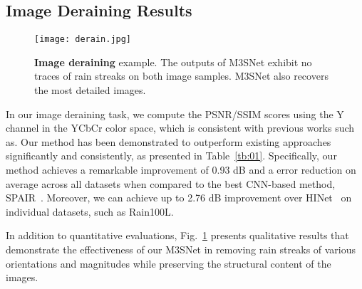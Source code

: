 \documentclass[sn-mathphys,Numbered]{sn-jnl}
\theoremstyle{thmstyleone}\newtheorem{theorem}{Theorem}\newtheorem{proposition}[theorem]{Proposition}
\theoremstyle{thmstyletwo}\newtheorem{example}{Example}\newtheorem{remark}{Remark}
\theoremstyle{thmstylethree}\newtheorem{definition}{Definition}
\begin{document}
\subsection{Image Deraining Results}
\begin{figure} \centerline{\texttt{[image: derain.jpg]}}
	\caption{\textbf{Image deraining} example. The outputs of M3SNet exhibit
no traces of rain streaks on both image samples. M3SNet also recovers the most detailed images.}
	\label{fig:06}
\end{figure}
In our image deraining task, we compute the PSNR/SSIM scores using the Y channel in the YCbCr color space, which is consistent with previous works such as\cite{Zamir2021MPRNet,MSPFN,SPAIR}. Our method has been demonstrated to outperform existing approaches significantly and consistently, as presented in Table~\ref{tb:01}. Specifically, our method achieves a remarkable improvement of 0.93 dB and a  error reduction on average across all datasets when compared to the best CNN-based method, SPAIR~\cite{SPAIR}. Moreover, we can achieve up to 2.76 dB improvement over HINet~\cite{Chen_2021_CVPR} on individual datasets, such as Rain100L.

In addition to quantitative evaluations, Fig.~\ref{fig:06} presents qualitative results that demonstrate the effectiveness of our M3SNet in removing rain streaks of various orientations and magnitudes while preserving the structural content of the images.
\end{document}
